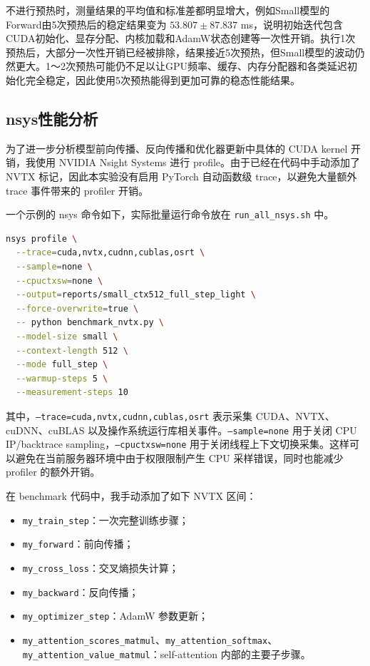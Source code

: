 \documentclass[12pt]{ctexart}
\begin{document}
不进行预热时，测量结果的平均值和标准差都明显增大，例如Small模型的Forward由5次预热后的稳定结果变为 $53.807\pm87.837$ ms，说明初始迭代包含CUDA初始化、显存分配、内核加载和AdamW状态创建等一次性开销。执行1次预热后，大部分一次性开销已经被排除，结果接近5次预热，但Small模型的波动仍然更大。1～2次预热可能仍不足以让GPU频率、缓存、内存分配器和各类延迟初始化完全稳定，因此使用5次预热能得到更加可靠的稳态性能结果。

\subsection{nsys性能分析}

为了进一步分析模型前向传播、反向传播和优化器更新中具体的 CUDA kernel 开销，我使用 NVIDIA Nsight Systems 进行 profile。由于已经在代码中手动添加了 NVTX 标记，因此本实验没有启用 PyTorch 自动函数级 trace，以避免大量额外 trace 事件带来的 profiler 开销。

一个示例的 nsys 命令如下，实际批量运行命令放在 \texttt{run\_all\_nsys.sh} 中。

\begin{lstlisting}[language=bash]
nsys profile \
  --trace=cuda,nvtx,cudnn,cublas,osrt \
  --sample=none \
  --cpuctxsw=none \
  --output=reports/small_ctx512_full_step_light \
  --force-overwrite=true \
  -- python benchmark_nvtx.py \
  --model-size small \
  --context-length 512 \
  --mode full_step \
  --warmup-steps 5 \
  --measurement-steps 10
\end{lstlisting}

其中，\texttt{--trace=cuda,nvtx,cudnn,cublas,osrt} 表示采集 CUDA、NVTX、cuDNN、cuBLAS 以及操作系统运行库相关事件。\texttt{--sample=none} 用于关闭 CPU IP/backtrace sampling，\texttt{--cpuctxsw=none} 用于关闭线程上下文切换采集。这样可以避免在当前服务器环境中由于权限限制产生 CPU 采样错误，同时也能减少 profiler 的额外开销。

在 benchmark 代码中，我手动添加了如下 NVTX 区间：

\begin{itemize}
    \item \texttt{my\_train\_step}：一次完整训练步骤；
    \item \texttt{my\_forward}：前向传播；
    \item \texttt{my\_cross\_loss}：交叉熵损失计算；
    \item \texttt{my\_backward}：反向传播；
    \item \texttt{my\_optimizer\_step}：AdamW 参数更新；
    \item \texttt{my\_attention\_scores\_matmul}、\texttt{my\_attention\_softmax}、\texttt{my\_attention\_value\_matmul}：self-attention 内部的主要子步骤。
\end{itemize}
\end{document}
